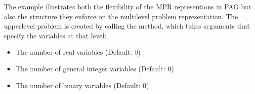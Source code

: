 \documentclass[letterpaper,10pt,english]{sphinxmanual}
\begin{document}
\begin{sphinxVerbatim}[commandchars=\\\{\}]
\PYG{p}{[}\PYG{p}{]}  \PYG{p}{[}\PYG{p}{[}  \PYG{p}{]}
         \PYG{p}{[} \PYG{p}{]}
         \PYG{p}{[}  \PYG{p}{]}\PYG{p}{]}
\PYG{p}{[}\PYG{p}{]}  \PYG{p}{[}\PYG{p}{[} \PYG{p}{]}
         \PYG{p}{[}\PYG{p}{]}
         \PYG{p}{[} \PYG{p}{]}\PYG{p}{]}
  \PYG{p}{[}  \PYG{p}{]}


  
  
\end{sphinxVerbatim}

The example illustrates both the flexibility of the MPR representions
in PAO but also the structure they enforce on the multilevel problem
representation.  The upper\sphinxhyphen{}level problem is created by calling the
 method, which takes arguments that specify the
variables at that level:
\begin{itemize}
\item {} 
 \sphinxhyphen{} The number of real variables (Default: 0)

\item {} 
 \sphinxhyphen{} The number of general integer variables (Default: 0)

\item {} 
 \sphinxhyphen{} The number of binary variables (Default: 0)

\end{itemize}
\end{document}
